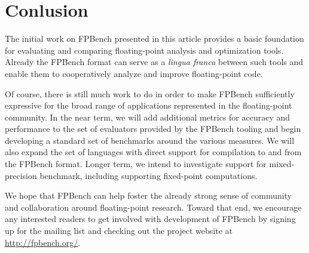 \documentclass[main.tex]{subfiles}
\begin{document}
\section{Conlusion}
\label{sec:conclusion}

The initial work on FPBench presented in this article provides a basic
foundation for evaluating and comparing floating-point analysis and
optimization tools.  Already the FPBench format can serve as a
\textit{lingua franca} between such tools and enable them to
cooperatively analyze and improve floating-point code.

Of course, there is still much work to do in order to make FPBench
sufficiently expressive for the broad range of applications represented
in the floating-point community.  In the near term, we will add additional
metrics for accuracy and performance to the set of evaluators provided by
the FPBench tooling and begin developing a standard set of benchmarks
around the various measures.  We will also expand the set of languages with
direct support for compilation to and from the FPBench format.  Longer
term, we intend to investigate support for mixed-precision benchmark,
including supporting fixed-point computations.

We hope that FPBench can help foster the already strong sense of community
and collaboration around floating-point research.  Toward that end, we
encourage any interested readers to get involved with development of
FPBench by signing up for the mailing list and checking out the project
website at \url{http://fpbench.org/}.
\end{document}

